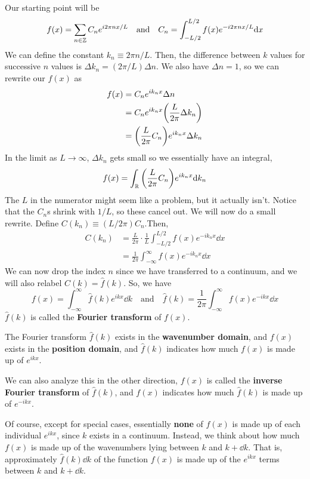 Our starting point will be 
\[ f(x) = \sum_{n\in\mathbb{Z}} C_ne^{i2\pi nx/L} \quad\text{and}\quad C_n = \int_{-L/2}^{L/2} f(x)e^{-i2\pi nx/L}\dd x\]
We can define the constant $k_n \equiv 2\pi n/L$. Then, the difference between $k$ values for successive $n$ values is $\Delta k_n = (2\pi/L)\Delta n$. We also have $\Delta n = 1$, so we can rewrite our $f(x)$ as
\begin{align*}
    f(x) &= C_n e^{ik_n x}\Delta n \\
    &= C_ne^{ik_nx} \pqty{\frac{L}{2\pi }\Delta k_n} \\
    &= \pqty{\frac{L}{2\pi}C_n}e^{ik_nx}\Delta k_n
\end{align*}
In the limit as $L\to \infty$, $\Delta k_n$ gets small so we essentially have an integral,
\[ f(x) = \int_\R \pqty{\frac{L}{2\pi}C_n}e^{ik_nx} \dd k_n\]
The $L$ in the numerator might seem like a problem, but it actually isn't. Notice that the $C_n$s shrink with $1/L$, so these cancel out. We will now do a small rewrite. Define $C(k_n) \equiv (L/2\pi) C_n$.Then,
\begin{align*}
    C(k_n) &= \frac{L}{2\pi} \cdot \frac{1}{L} \int_{-L/2}^{L/2} f(x)e^{-ik_nx}\dd x \\
    &= \frac{1}{2\pi}\int_{-\infty}^\infty f(x)e^{-ik_nx}\dd x
\end{align*}
We can now drop the index $n$ since we have transferred to a continuum, and we will also relabel $C(k) = \hat f(k)$. So, we have
\[ f(x) = \int_{-\infty}^\infty \hat f(k)e^{ikx}\dd k\quad\text{and}\quad \hat f(k) = \frac{1}{2\pi}\int_{-\infty}^\infty f(x)e^{-ikx}\dd x\]
$\hat f(k)$ is called the \textbf{Fourier transform} of $f(x)$.

The Fourier transform $\hat f(k)$ exists in the \textbf{wavenumber domain}, and $f(x)$ exists in the \textbf{position domain}, and $\hat f(k)$ indicates how much $f(x)$ is made up of $e^{ikx}$. 

We can also analyze this in the other direction, $f(x)$ is called the \textbf{inverse Fourier transform} of $\hat f(k)$, and $f(x)$ indicates how much $\hat f(k)$ is made up of $e^{-ikx}$. 

Of course, except for special cases, essentially \textbf{none} of $f(x)$ is made up of each individual $e^{ikx}$, since $k$ exists in a continuum. Instead, we think about how much $f(x)$ is made up of the wavenumbers lying between $k$ and $k+\dd k$. That is, approximately $\hat f(k)\dd k$ of the function $f(x)$ is made up of the $e^{ikx}$ terms between $k$ and $k+\dd k$.

